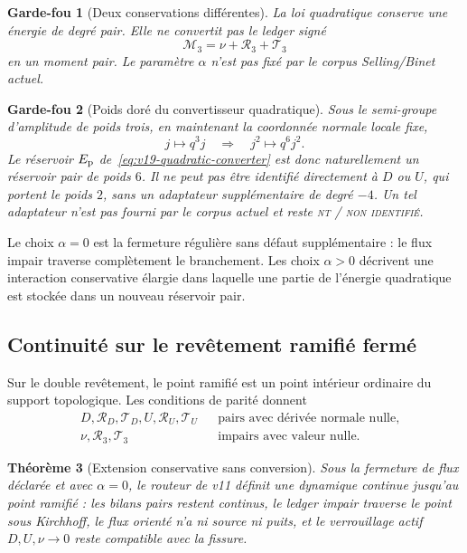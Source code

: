 \documentclass[11pt,a4paper]{article}
\newtheorem{theorem}{Théorème}[section]
\newtheorem{guardrail}[theorem]{Garde-fou}
\newcommand{\statusNT}{\textsc{nt / non identifié}}
\begin{document}
\begin{guardrail}[Deux conservations différentes]
La loi quadratique conserve une énergie de degré pair. Elle ne convertit pas le ledger signé
\[
 \mathcal M_3=\nu+\mathscr R_3+\mathscr T_3
\]
en un moment pair. Le paramètre $\alpha$ n'est pas fixé par le corpus Selling/Binet actuel.
\end{guardrail}

\begin{guardrail}[Poids doré du convertisseur quadratique]
Sous le semi-groupe d'amplitude de poids trois, en maintenant la coordonnée normale locale fixe,
\[
 j\longmapsto q^3j
 \quad\Longrightarrow\quad
 j^2\longmapsto q^6j^2.
\]
Le réservoir $E_{\rm p}$ de~\eqref{eq:v19-quadratic-converter} est donc naturellement un réservoir pair de poids $6$. Il ne peut pas être identifié directement à $D$ ou $U$, qui portent le poids $2$, sans un adaptateur supplémentaire de degré $-4$. Un tel adaptateur n'est pas fourni par le corpus actuel et reste \statusNT{}.
\end{guardrail}

Le choix $\alpha=0$ est la fermeture régulière sans défaut supplémentaire : le flux impair traverse complètement le branchement. Les choix $\alpha>0$ décrivent une interaction conservative élargie dans laquelle une partie de l'énergie quadratique est stockée dans un nouveau réservoir pair.

\subsection{Continuité sur le revêtement ramifié fermé}

Sur le double revêtement, le point ramifié est un point intérieur ordinaire du support topologique. Les conditions de parité donnent
\[
 \boxed{
 \begin{aligned}
 &D,\mathscr R_D,\mathscr T_D,
 U,\mathscr R_U,\mathscr T_U
 &&\text{pairs avec dérivée normale nulle},\\
 &\nu,\mathscr R_3,\mathscr T_3
 &&\text{impairs avec valeur nulle}.
 \end{aligned}}
\]

\begin{theorem}[Extension conservative sans conversion]\label{thm:v19-closed-extension}
Sous la fermeture de flux déclarée et avec $\alpha=0$, le routeur de v11 définit une dynamique continue jusqu'au point ramifié : les bilans pairs restent continus, le ledger impair traverse le point sous Kirchhoff, le flux orienté n'a ni source ni puits, et le verrouillage actif $D,U,\nu\to0$ reste compatible avec la fissure.
\end{theorem}
\end{document}
